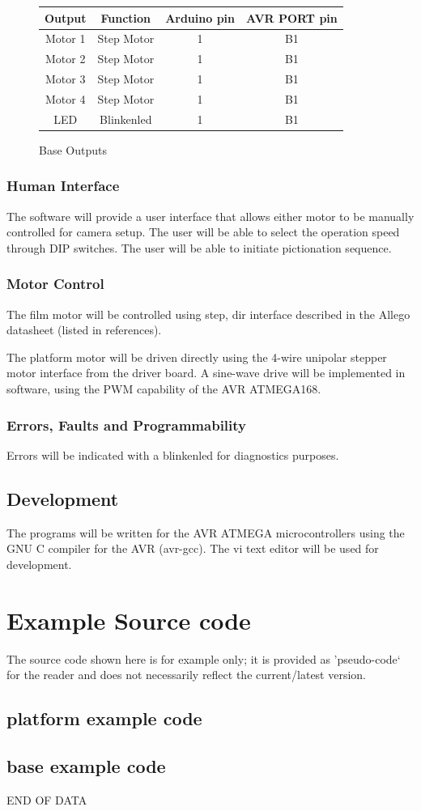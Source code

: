 \documentclass[dvips,12pt]{article}
\begin{document}
\renewcommand{\arraystretch}{1.4}%
\begin{figure}[htb]
\centering
\begin{tabular}{|c|c|c|c|}
\hline
Output&Function&Arduino pin&AVR PORT pin\\
\hline
Motor 1&Step Motor&1&B1\\
\hline
Motor 2&Step Motor&1&B1\\
\hline
Motor 3&Step Motor&1&B1\\
\hline
Motor 4&Step Motor&1&B1\\
\hline
LED&Blinkenled&1&B1\\
\hline
\end{tabular}
\caption{Base Outputs}
\label{fig:baseoutputs}
\end{figure}

\subsubsection{Human Interface}
The software will provide a user interface that allows either motor to be manually controlled for camera setup. The user will be able to select the operation speed through DIP switches. The user will be able to initiate pictionation sequence. 
\subsubsection{Motor Control}
The film motor will be controlled using step, dir interface described in the Allego datasheet (listed in references).

The platform motor will be driven directly using the 4-wire unipolar stepper motor interface from the driver board. A sine-wave drive will be implemented in software, using the PWM capability of the AVR ATMEGA168.
\subsubsection{Errors, Faults and Programmability}
Errors will be indicated with a blinkenled for diagnostics purposes.
\subsection{Development}
The programs will be written for the AVR ATMEGA microcontrollers using the GNU C compiler for the AVR (avr-gcc). The vi text editor will be used for development.


\section{Example Source code}
The source code shown here is for example only; it is provided as 'pseudo-code` for the reader and does not necessarily reflect the current/latest version.
\subsection{platform example code}
\subsection{base example code}

\centering

\vspace{2cm}

END OF DATA
\appendix
\end{document}
